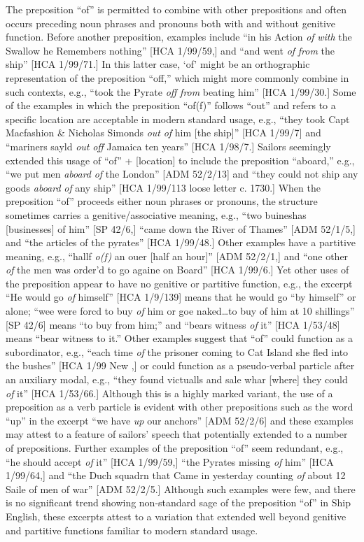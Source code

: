 The preposition “of” is permitted to combine with other prepositions and often occurs preceding noun phrases and pronouns both with and without genitive function. Before another preposition, examples include “in his Action \textit{of} \textit{with} the Swallow he Remembers nothing” [HCA 1/99/59,] and “and went \textit{of} \textit{from} the ship” [HCA 1/99/71.]  In this latter case, ‘of’ might be an orthographic representation of the preposition “off,” which might more commonly combine in such contexts, e.g., “took the Pyrate \textit{off} \textit{from} beating him” [HCA 1/99/30.] Some of the examples in which the preposition “of(f)” follows “out” and refers to a specific location are acceptable in modern standard usage, e.g., “they took Capt Macfashion \& Nicholas Simonds \textit{out} \textit{of} him [the ship]” [HCA 1/99/7] and “mariners sayld \textit{out} \textit{off} Jamaica ten years” [HCA 1/98/7.] Sailors seemingly extended this usage of “of” + [location] to include the preposition “aboard,” e.g., “we put men \textit{aboard} \textit{of} the London” [ADM 52/2/13] and “they could not ship any goods \textit{aboard} \textit{of} any ship” [HCA 1/99/113 loose letter c. 1730.] When the preposition “of” proceeds either noun phrases or pronouns, the structure sometimes carries a genitive/associative meaning, e.g., “two buineshas [businesses] of him” [SP 42/6,] “came down the River of Thames” [ADM 52/1/5,] and “the articles of the pyrates” [HCA 1/99/48.] Other examples have a partitive meaning, e.g., “hallf \textit{o(f)} an ouer [half an hour]” [ADM 52/2/1,] and “one other \textit{of} the men was order’d to go againe on Board” [HCA 1/99/6.] Yet other uses of the preposition appear to have no genitive or partitive function, e.g., the excerpt “He would go \textit{of} himself” [HCA 1/9/139] means that he would go “by himself” or alone; “wee were forcd to buy \textit{of} him or goe naked…to buy of him at 10 shillings” [SP 42/6] means “to buy from him;” and “bears witness \textit{of} it” [HCA 1/53/48] means “bear witness to it.” Other examples suggest that “of” could function as a subordinator, e.g., “each time \textit{of} the prisoner coming to Cat Island she fled into the bushes” [HCA 1/99 New \citealt{Providence1722},] or could function as a pseudo-verbal particle after an auxiliary modal, e.g., “they found victualls and sale whar [where] they could \textit{of} it” [HCA 1/53/66.] Although this is a highly marked variant, the use of a preposition as a verb particle is evident with other prepositions such as the word “up” in the excerpt “we have \textit{up} our anchors” [ADM 52/2/6] and these examples may attest to a feature of sailors’ speech that potentially extended to a number of prepositions. Further examples of the preposition “of” seem redundant, e.g., “he should accept \textit{of} it” [HCA 1/99/59,] “the Pyrates missing \textit{of} him” [HCA 1/99/64,] and “the Duch squadrn that Came in yesterday counting \textit{of} about 12 Saile of men of war” [ADM 52/2/5.] Although such examples were few, and there is no significant trend showing non-standard sage of the preposition “of” in Ship English, these excerpts attest to a variation that extended well beyond genitive and partitive functions familiar to modern standard usage. 

